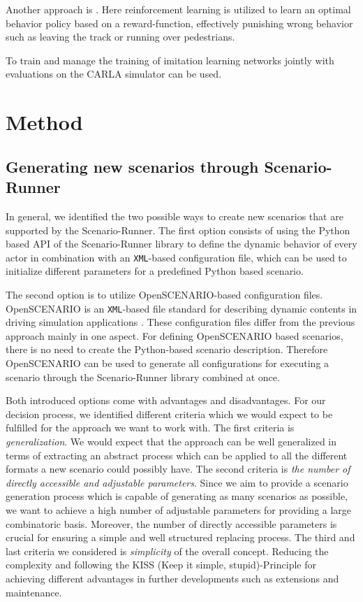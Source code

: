 \documentclass[conference, a4paper, 11pt]{IEEEtran}
\begin{document}
	Another approach is  \cite{Toromanoff_2020_CVPR}. Here reinforcement learning is utilized to learn an optimal behavior policy based on a reward-function, effectively punishing wrong behavior such as leaving the track or running over pedestrians.
	
	To train and manage the training of imitation learning networks jointly with evaluations on the CARLA simulator  \cite{felipecode:coiltraine} can be used.
	
	\section{Method}
	
	\subsection{Generating new scenarios through Scenario-Runner}
	In general, we identified the two possible ways to create new scenarios that are supported by the Scenario-Runner.
	The first option consists of using the Python based API of the Scenario-Runner library to define the dynamic behavior of every actor in combination with an \texttt{XML}-based configuration file, which can be used to initialize different parameters for a predefined Python based scenario.
	
	The second option is to utilize OpenSCENARIO-based configuration files. OpenSCENARIO is an \texttt{XML}-based file standard for describing dynamic contents in driving simulation applications \cite{OpenScenario}. These configuration files differ from the previous approach mainly in one aspect. For defining OpenSCENARIO based scenarios, there is no need to create the Python-based scenario description. Therefore OpenSCENARIO can be used to generate all configurations for executing a scenario through the Scenario-Runner library combined at once. 
	
	Both introduced options come with advantages and disadvantages. For our decision process, we identified different criteria which we would expect to be fulfilled for the approach we want to work with. 
	The first criteria is \textit{generalization}. We would expect that the approach can be well generalized in terms of  extracting an abstract process which can be applied to all the different formats a new scenario could possibly have.
	The second criteria is \textit{the number of directly accessible and adjustable parameters}. Since we aim to provide a scenario generation process which is capable of generating as many scenarios as possible, we want to achieve a high number of adjustable parameters for providing a large combinatoric basis. Moreover, the number of directly accessible parameters is crucial for ensuring a simple and well structured replacing process.
	The third and last criteria we considered is \textit{simplicity} of the overall concept. Reducing the complexity and  following the KISS (Keep it simple, stupid)-Principle for achieving different advantages in further developments such as extensions and maintenance. 
	
\end{document}
